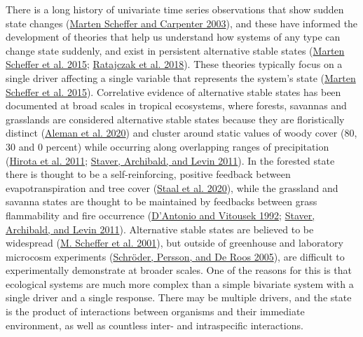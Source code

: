 \documentclass[
  12pt,
]{article}
\begin{document}
There is a long history of univariate time series observations that show
sudden state changes (\protect\hyperlink{ref-Scheffer2003}{Marten
Scheffer and Carpenter 2003}), and these have informed the development
of theories that help us understand how systems of any type can change
state suddenly, and exist in persistent alternative stable states
(\protect\hyperlink{ref-Scheffer2015}{Marten Scheffer et al. 2015};
\protect\hyperlink{ref-Ratajczak2018}{Ratajczak et al. 2018}). These
theories typically focus on a single driver affecting a single variable
that represents the system's state
(\protect\hyperlink{ref-Scheffer2015}{Marten Scheffer et al. 2015}).
Correlative evidence of alternative stable states has been documented at
broad scales in tropical ecosystems, where forests, savannas and
grasslands are considered alternative stable states because they are
floristically distinct (\protect\hyperlink{ref-Aleman2020}{Aleman et al.
2020}) and cluster around static values of woody cover (80, 30 and 0
percent) while occurring along overlapping ranges of precipitation
(\protect\hyperlink{ref-Hirota2011}{Hirota et al. 2011};
\protect\hyperlink{ref-Staver2011}{Staver, Archibald, and Levin 2011}).
In the forested state there is thought to be a self-reinforcing,
positive feedback between evapotranspiration and tree cover
(\protect\hyperlink{ref-Staal2020}{Staal et al. 2020}), while the
grassland and savanna states are thought to be maintained by feedbacks
between grass flammability and fire occurrence
(\protect\hyperlink{ref-DAntonio1992}{D'Antonio and Vitousek 1992};
\protect\hyperlink{ref-Staver2011}{Staver, Archibald, and Levin 2011}).
Alternative stable states are believed to be widespread
(\protect\hyperlink{ref-Scheffer2001}{M. Scheffer et al. 2001}), but
outside of greenhouse and laboratory microcosm experiments
(\protect\hyperlink{ref-Schroder2005}{Schröder, Persson, and De Roos
2005}), are difficult to experimentally demonstrate at broader scales.
One of the reasons for this is that ecological systems are much more
complex than a simple bivariate system with a single driver and a single
response. There may be multiple drivers, and the state is the product of
interactions between organisms and their immediate environment, as well
as countless inter- and intraspecific interactions.
\end{document}

